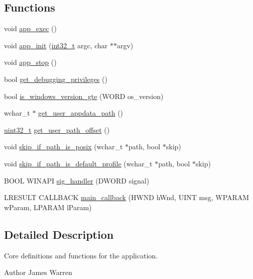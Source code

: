 \subsection*{Functions}
\begin{DoxyCompactItemize}
\item 
void \hyperlink{app_8h_a6259e72a343cd6012e8ceb017bac8556}{app\-\_\-exec} ()
\item 
void \hyperlink{app_8h_a7ab0624f9c8aeab843f91432c75638ee}{app\-\_\-init} (\hyperlink{stdint_8h_a32f2e37ee053cf2ce8ca28d1f74630e5}{int32\-\_\-t} argc, char $\ast$$\ast$argv)
\item 
void \hyperlink{app_8h_ae49ddc9faf2e3e1d4bf833014d18e56e}{app\-\_\-stop} ()
\item 
bool \hyperlink{app_8h_acd734b41204e59d424b59f760b6a79ee}{get\-\_\-debugging\-\_\-privileges} ()
\item 
bool \hyperlink{app_8h_a4e45ac0d06680adf5c65acb7b597617c}{is\-\_\-windows\-\_\-version\-\_\-gte} (W\-O\-R\-D os\-\_\-version)
\item 
wchar\-\_\-t $\ast$ \hyperlink{app_8h_a09f9e8a59f8f89622daca67693af69b2}{get\-\_\-user\-\_\-appdata\-\_\-path} ()
\item 
\hyperlink{stdint_8h_a435d1572bf3f880d55459d9805097f62}{uint32\-\_\-t} \hyperlink{app_8h_abe3867af78ff34eac78fc7057e9c9be8}{get\-\_\-user\-\_\-path\-\_\-offset} ()
\item 
void \hyperlink{app_8h_aa7477f60c345b2e0a751f0d6d38defe6}{skip\-\_\-if\-\_\-path\-\_\-is\-\_\-posix} (wchar\-\_\-t $\ast$path, bool $\ast$skip)
\item 
void \hyperlink{app_8h_a363d6654bd8c19abf1c65abdc89877bf}{skip\-\_\-if\-\_\-path\-\_\-is\-\_\-default\-\_\-profile} (wchar\-\_\-t $\ast$path, bool $\ast$skip)
\item 
B\-O\-O\-L W\-I\-N\-A\-P\-I \hyperlink{app_8h_a09b121e8dcd0287e71d2366987b2f251}{sig\-\_\-handler} (D\-W\-O\-R\-D signal)
\item 
L\-R\-E\-S\-U\-L\-T C\-A\-L\-L\-B\-A\-C\-K \hyperlink{app_8h_ac3dcc43265dd8ae5f74529e8ac05dc67}{main\-\_\-callback} (H\-W\-N\-D h\-Wnd, U\-I\-N\-T msg, W\-P\-A\-R\-A\-M w\-Param, L\-P\-A\-R\-A\-M l\-Param)
\end{DoxyCompactItemize}


\subsection{Detailed Description}
Core definitions and functions for the application. \begin{DoxyAuthor}{Author}
James Warren 
\end{DoxyAuthor}


